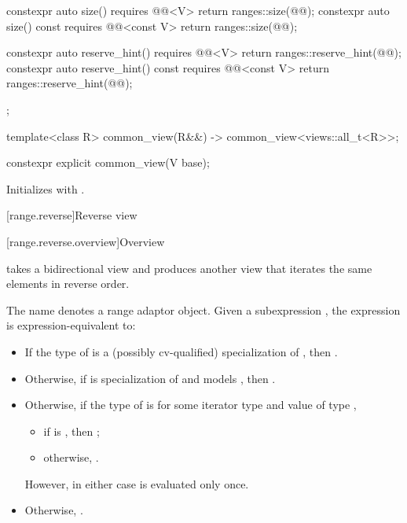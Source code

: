 \begin{codeblock}
{{    constexpr auto size() requires @@<V> {
      return ranges::size(@@);
    }
    constexpr auto size() const requires @@<const V> {
      return ranges::size(@@);
    }

    constexpr auto reserve_hint() requires @@<V> {
      return ranges::reserve_hint(@@);
    }
    constexpr auto reserve_hint() const requires @@<const V> {
      return ranges::reserve_hint(@@);
    }
  };

  template<class R>
    common_view(R&&) -> common_view<views::all_t<R>>;
}
\end{codeblock}

%
\begin{itemdecl}
constexpr explicit common_view(V base);
\end{itemdecl}

\begin{itemdescr}
\pnum
\effects
Initializes  with .
\end{itemdescr}

[range.reverse]{Reverse view}

[range.reverse.overview]{Overview}

\pnum
{} takes a bidirectional view and produces
another view that iterates the same elements in reverse order.

\pnum
{}%
The name  denotes a
range adaptor object.
Given a subexpression , the expression
 is expression-equivalent to:
\begin{itemize}
\item
  If the type of  is
  a (possibly cv-qualified) specialization of ,
  then .
\item
  Otherwise, if  is specialization of  and 
  models , then .
\item
  Otherwise, if the type of  is \cv{} 
  for some iterator type  and
  value  of type ,
  \begin{itemize}
  \item
    if  is , then
;
  \item
    otherwise, .
  \end{itemize}
  However, in either case  is evaluated only once.
\item
  Otherwise, .
\end{itemize}

